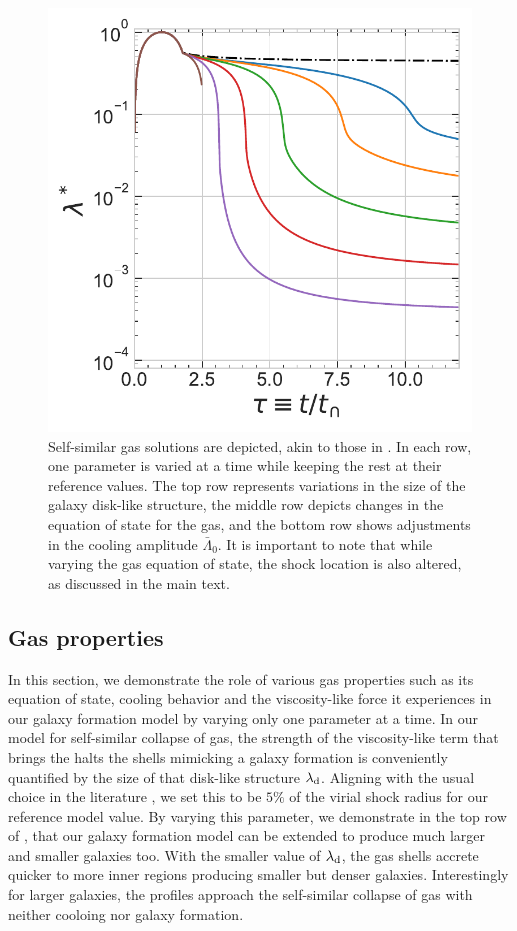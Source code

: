 \begin{figure}[htbp]
\includegraphics[width=0.325\linewidth,trim={0 0cm 0 0},clip]{plots/Eds-gaso_trajectory_shocked_vary-cooling.pdf}
\caption{Self-similar gas solutions are depicted, akin to those in .  In each row, one parameter is varied at a time while keeping the rest at their reference values. The top row represents variations in the size of the galaxy disk-like structure, the middle row depicts changes in the equation of state for the gas, and the bottom row shows adjustments in the cooling amplitude $\bar{\Lambda}_0$. It is important to note that while varying the gas equation of state, the shock location is also altered, as discussed in the main text.} %
\label{fig:gaso-all2-ch:ssr}
\end{figure}



\subsection{Gas properties}
In this section, we demonstrate the role of various gas properties such as its equation of state, cooling behavior and the viscosity-like force it experiences in our galaxy formation model by varying only one parameter at a time.
In our model for self-similar collapse of gas, the strength of the viscosity-like term that brings the halts the shells mimicking a galaxy formation is conveniently quantified by the size of that disk-like structure $\lambda_{\rm d}$. Aligning with the usual choice in the literature \cite{2006Dekel&Birnboim}, we set this to be $5\%$ of the virial shock radius for our reference model value. By varying this parameter, we demonstrate in the top row of , that our galaxy formation model can be extended to produce much larger and smaller galaxies too. With the smaller value of $\lambda_{\rm d}$, the gas shells accrete quicker to more inner regions producing smaller but denser galaxies. Interestingly for larger galaxies, the profiles approach the self-similar collapse of gas with neither cooloing nor galaxy formation.

